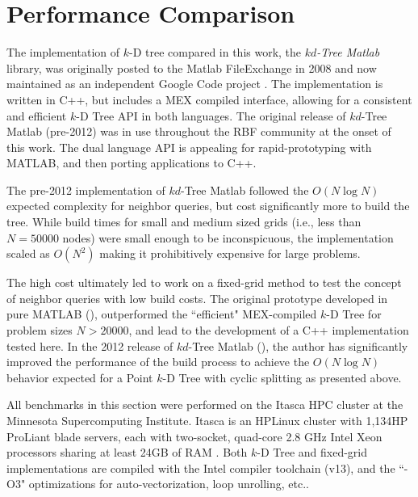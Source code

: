 \documentclass{report}
\begin{document}
\section{Performance Comparison}
\label{sec:fixed_grid_benchmarks}

The implementation of $k$-D tree compared in this work, the \emph{$kd$-Tree Matlab} library, was originally posted to the Matlab FileExchange in 2008 \cite{TagliasacchiMFE} and now maintained as an independent Google Code project \cite{TagliasacchiGC}. The implementation is written in C++, but includes a MEX compiled interface, allowing for a consistent and efficient $k$-D Tree API in both languages. 
The original release of $kd$-Tree Matlab (pre-2012) was in use throughout the RBF community at the onset of this work. The dual language API is appealing for rapid-prototyping with MATLAB, and then porting applications to C++. 

The pre-2012 implementation of $kd$-Tree Matlab followed the $O(N \log N)$ expected complexity for neighbor queries, but cost significantly more to build the tree. While build times for small and medium sized grids (i.e., less than $N=50000$ nodes) were small enough to be inconspicuous, the implementation scaled as $O(N^2)$ making it prohibitively expensive for large problems. 

The high cost ultimately led to work on a fixed-grid method to test the concept of neighbor queries with low build costs. The original prototype developed in pure MATLAB (\cite{BolligRBFFixedGrid}), outperformed the ``efficient" MEX-compiled $k$-D Tree for problem sizes $N > 20000$, and lead to the development of a C++ implementation tested here. In the 2012 release of $kd$-Tree Matlab (\cite{TagliasacchiGC}), the author has significantly improved the performance of the build process to achieve the $O(N \log N)$ behavior expected for a Point $k$-D Tree with cyclic splitting as presented above. 

All benchmarks in this section were performed on the Itasca HPC cluster at the Minnesota Supercomputing Institute. Itasca is an HPLinux cluster with 1,134HP ProLiant blade servers, each with two-socket, quad-core 2.8 GHz Intel Xeon processors sharing at least 24GB of RAM \cite{MSIItasca}. Both $k$-D Tree and fixed-grid implementations are compiled with the Intel compiler toolchain (v13), and the ``-O3" optimizations for auto-vectorization, loop unrolling, etc.. 
\end{document}
